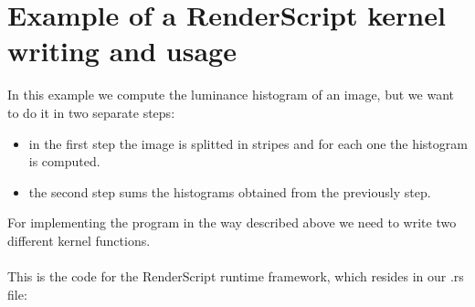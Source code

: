 \section{Example of a RenderScript kernel writing and usage}
\label{app:ex2}
\noindent In this example we compute the luminance histogram of an image, but we want to do it in two separate steps:
\begin{itemize}
\item in the first step the image is splitted in stripes and for each one the histogram is computed.
\item the second step sums the histograms obtained from the previously step.
\end{itemize}
For implementing the program in the way described above we need to write two different kernel functions.
\\\\
This is the code for the RenderScript runtime framework, which resides in our .rs file:

